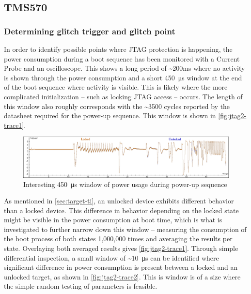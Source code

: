 \documentclass[10pt]{article}
\newcommand{\TI}{TMS570\xspace}
\begin{document}
  \subsection{\TI}


  \subsubsection{Determining glitch trigger and glitch point}
    \label{sec:jtag-setup}
    In order to identify possible points where JTAG protection is happening, the power consumption during a boot sequence has been monitored with a Current Probe and an oscilloscope.  This shows a long period of \textasciitilde200ms where no activity is shown through the power consumption and a short 450\SI{}{\micro\second} window at the end of the boot sequence where activity is visible. This is likely where the more complicated initialization -- such as locking JTAG access -- occurs. The length of this window also roughly corresponds with the \textasciitilde3500 cycles reported by the datasheet \cite{texas_instruments_datasheet_2015} required for the power-up sequence. This window is shown in \autoref{fig:jtag2-trace1}.  

    \begin{figure}[H]
      \centering
      \includegraphics[width=\textwidth]{../plots/tms57-trace1.png}
      \caption{Interesting \SI{450}{\micro\second} window of power usage during power-up sequence}
      \label{fig:jtag2-trace1}
    \end{figure}

    As mentioned in \autoref{sec:target-ti}, an unlocked device exhibits different behavior than a locked device. This difference in behavior depending on the locked state might be visible in the power consumption at boot time, which is what is investigated to further narrow down this window -- 
    measuring the consumption of the boot process of both states 1,000,000 times and averaging the results per state. Overlaying both averaged results gives \autoref{fig:jtag2-trace1}. Through simple differential inspection, a small window of \textasciitilde\SI{10}{\micro\second} can be identified where significant difference in power consumption is present between a locked and an unlocked target, as shown in \autoref{fig:jtag2-trace2}. This is window is of a size where the simple random testing of parameters is feasible.
\end{document}
